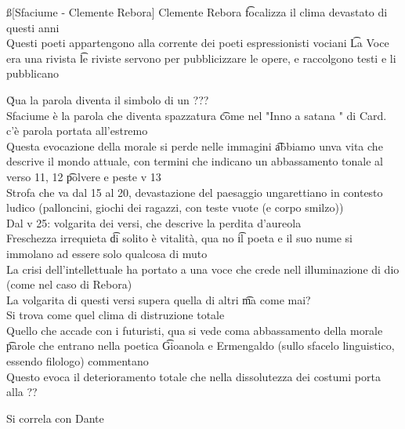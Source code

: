 \documentclass[12pt]{article}
\begin{document}
\ss[Sfaciume - Clemente Rebora]
Clemente Rebora \t focalizza il clima devastato di questi anni \\
Questi poeti appartengono alla corrente dei poeti espressionisti vociani \t La Voce era una rivista \t le riviste servono per pubblicizzare le opere, e raccolgono testi e li pubblicano

\v

Qua la parola diventa il simbolo di un ??? \\
Sfaciume è la parola che diventa spazzatura \t come nel "Inno a satana " di Card. c'è parola portata all'estremo \\
Questa evocazione della morale si perde nelle immagini \t abbiamo unva vita che descrive il mondo attuale, con termini che indicano un abbassamento tonale al verso 11, 12 \t polvere e peste v 13 \\
Strofa che va dal 15 al 20, devastazione del paesaggio ungarettiano in contesto ludico (palloncini, giochi dei ragazzi, con teste vuote (e corpo smilzo)) \\
Dal v 25: volgarita dei versi, che descrive la perdita d'aureola \\
Freschezza irrequieta \t di solito è vitalità, qua no \t il poeta e il suo nume si immolano ad essere solo qualcosa di muto \\
La crisi dell'intellettuale ha portato a una voce che crede nell illuminazione di dio (come nel caso di Rebora) \\
La volgarita di questi versi supera quella di altri \t ma come mai? \\
Si trova come quel clima di distruzione totale \\
Quello che accade con i futuristi, qua si vede coma abbassamento della morale \t parole che entrano nella poetica \t Gioanola e Ermengaldo (sullo sfacelo linguistico, essendo filologo) commentano \\
Questo evoca il deterioramento totale che nella dissolutezza dei costumi porta alla ??

\s[Montale]
Si correla con Dante 
\end{document}
